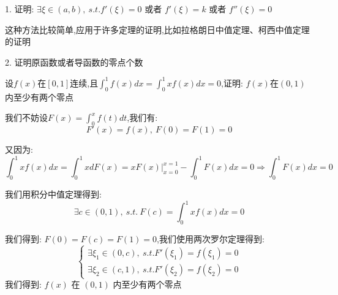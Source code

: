 1. 证明: $\exists \xi\in(a,b),\ s.t. f'(\xi)=0$ 或者 $f'(\xi)=k$ 或者 $f''(\xi)=0$
\begin{anymark}[注]
	这种方法比较简单,应用于许多定理的证明,比如拉格朗日中值定理、柯西中值定理的证明
\end{anymark}


2. 证明原函数或者导函数的零点个数
\begin{proposition}
	设$f(x)$在$[0,1]$连续,且$\int_{0}^{1}f(x)dx=\int_{0}^{1}xf(x)dx=0$,证明: $f(x)$在$(0,1)$内至少有两个零点
\end{proposition}
\begin{solution}

	我们不妨设$F(x)=\int_{0}^{x}f(t)dt$,我们有:
	$$F'(x)=f(x),\ F(0)=F(1)=0$$

	又因为: $$\int_{0}^{1}xf(x)dx=\int_{0}^{1}xdF(x)=xF(x)|_{x=0}^{x=1}-\int_{0}^{1}F(x)dx=0\Rightarrow \int_{0}^{1}F(x)dx=0$$

	我们用积分中值定理得到:
	$$\exists c\in(0,1),\ s.t.\ F(c)=\int_{0}^{1}xf(x)dx=0$$

	我们得到: $F(0)=F(c)=F(1)=0$,我们使用两次罗尔定理得到:
	$$\left\lbrace
		\begin{array}{l}
			\exists \xi_{1}\in(0,c),\ s.t. F'(\xi_{1})=f(\xi_{1})=0 \\
			\exists \xi_{2}\in(c,1),\ s.t. F'(\xi_{2})=f(\xi_{2})=0
		\end{array}
		\right.$$
	我们得到: $f(x)$ 在 $(0,1)$ 内至少有两个零点
\end{solution}


